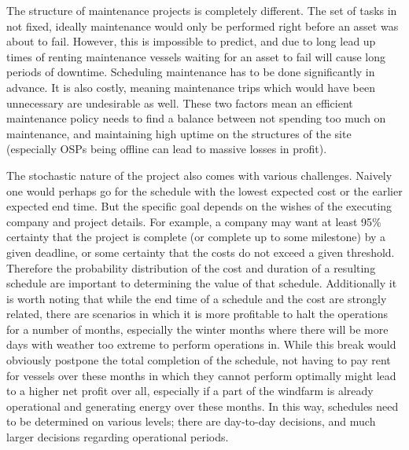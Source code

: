 \documentclass[a4paper,12pt]{article}
\begin{document}
The structure of maintenance projects is completely different. The set of tasks in not fixed, ideally maintenance would only be performed right before an asset was about to fail. However, this is impossible to predict, and due to long lead up times of renting maintenance vessels waiting for an asset to fail will cause long periods of downtime. Scheduling maintenance has to be done significantly in advance. It is also costly, meaning maintenance trips which would have been unnecessary are undesirable as well. These two factors mean an efficient maintenance policy needs to find a balance between not spending too much on maintenance, and maintaining high uptime on the structures of the site (especially OSPs being offline can lead to massive losses in profit). 

The stochastic nature of the project also comes with various challenges. Naively one would perhaps go for the schedule with the lowest expected cost or the earlier expected end time. But the specific goal depends on the wishes of the executing company and project details. For example, a company may want at least 95\% certainty that the project is complete (or complete up to some milestone) by a given deadline, or some certainty that the costs do not exceed a given threshold. Therefore the probability distribution of the cost and duration of a resulting schedule are important to determining the value of that schedule. Additionally it is worth noting that while the end time of a schedule and the cost are strongly related, there are scenarios in which it is more profitable to halt the operations for a number of months, especially the winter months where there will be more days with weather too extreme to perform operations in. While this break would obviously postpone the total completion of the schedule, not having to pay rent for vessels over these months in which they cannot perform optimally might lead to a higher net profit over all, especially if a part of the windfarm is already operational and generating energy over these months. In this way, schedules need to be determined on various levels; there are day-to-day decisions, and much larger decisions regarding operational periods. 

\end{document}

